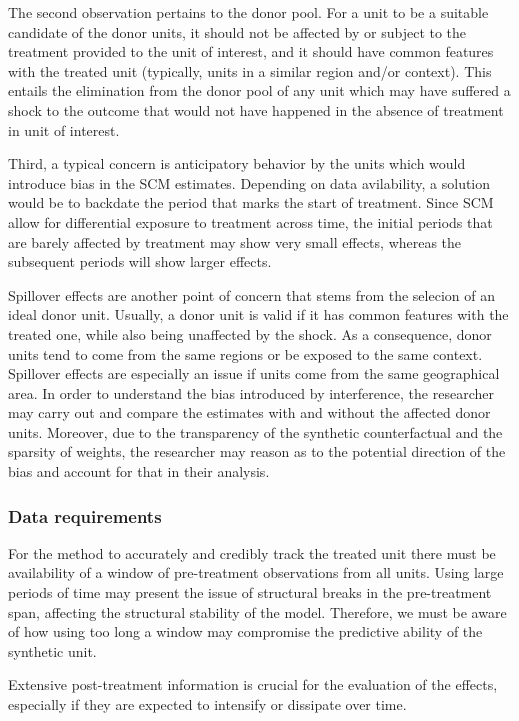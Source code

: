 \documentclass[12pt,a4paper,draft]{article}
\begin{document}
The second observation pertains to the donor pool. For a unit to be a suitable 
candidate of the donor units, it should not be affected by or subject to the 
treatment provided to the unit of interest, and it should have common features 
with the treated unit (typically, units in a similar region and/or context). 
This entails the elimination from the 
donor pool of any unit which may have suffered a shock to the outcome that would 
not have happened in the absence of treatment in unit of interest.


Third, a typical concern is anticipatory behavior by the units which would 
introduce bias in the SCM estimates. Depending on data avilability, a solution 
would be to backdate the period that marks the start of treatment. Since SCM allow 
for differential exposure to treatment across time, the initial periods that 
are barely affected by treatment may show very small effects, whereas the subsequent 
periods will show larger effects.

Spillover effects are another point of concern that stems from the selecion of 
an ideal donor unit. Usually, a donor unit is valid if it has common features 
with the treated one, while also being unaffected by the shock. As a consequence, 
donor units tend to come from the same regions or be exposed to the same 
context. Spillover effects are especially an issue if units come from the same 
geographical area. In order to understand the bias introduced by interference, 
the researcher may carry out and compare the estimates with and without the 
affected donor units. Moreover, due to the transparency of the synthetic 
counterfactual and the sparsity of weights, the researcher may reason as to the 
potential direction of the bias and account for that in their analysis.

\subsubsection{Data requirements}

For the method to accurately and credibly track the treated unit there must be 
availability of a window of pre-treatment observations from all units. Using large 
periods of time may present the issue of structural breaks in the pre-treatment 
span, affecting the structural stability of the model. 
Therefore, we must be aware of how using too long a window may compromise the 
predictive ability of the synthetic unit. 

Extensive post-treatment information is crucial for the evaluation of the effects, 
especially if they are expected to intensify or dissipate over time.
\end{document}
